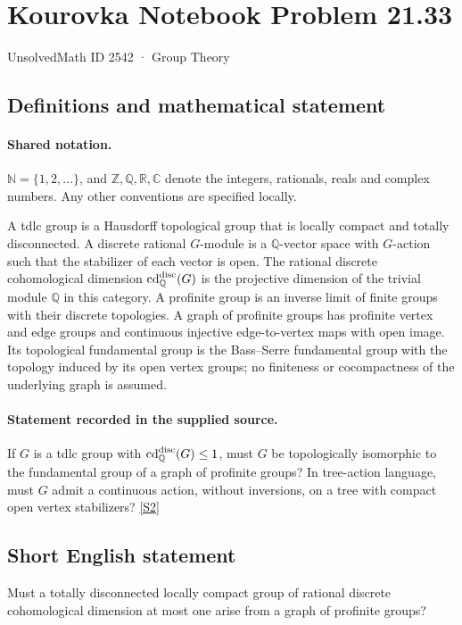 \documentclass[11pt]{article}
\newcommand{\sref}[2]{\hyperlink{source:#1:#2}{[S#2]}}
\begin{document}
\setcounter{section}{2541}
\section{Kourovka Notebook Problem 21.33}\label{2542}
{\small\sffamily UnsolvedMath ID 2542 · Group Theory}
\subsection{Definitions and mathematical statement}

\paragraph{Shared notation.}$\mathbb N=\{1,2,\ldots\}$, and $\mathbb Z,\mathbb Q,\mathbb R,\mathbb C$ denote the integers, rationals, reals and complex numbers. Any other conventions are specified locally.


A tdlc group is a Hausdorff topological group that is locally compact and totally disconnected. A discrete rational $G$-module is a $\mathbb Q$-vector space with $G$-action such that the stabilizer of each vector is open. The rational discrete cohomological dimension $\operatorname{cd}_{\mathbb Q}^{\rm disc}(G)$ is the projective dimension of the trivial module $\mathbb Q$ in this category. A profinite group is an inverse limit of finite groups with their discrete topologies. A graph of profinite groups has profinite vertex and edge groups and continuous injective edge-to-vertex maps with open image. Its topological fundamental group is the Bass--Serre fundamental group with the topology induced by its open vertex groups; no finiteness or cocompactness of the underlying graph is assumed.
\paragraph{Statement recorded in the supplied source.}
If $G$ is a tdlc group with $\operatorname{cd}_{\mathbb Q}^{\rm disc}(G)\leq1$, must $G$ be topologically isomorphic to the fundamental group of a graph of profinite groups? In tree-action language, must $G$ admit a continuous action, without inversions, on a tree with compact open vertex stabilizers? \sref{2542}{2}
\subsection{Short English statement}
Must a totally disconnected locally compact group of rational discrete cohomological dimension at most one arise from a graph of profinite groups?
\end{document}
